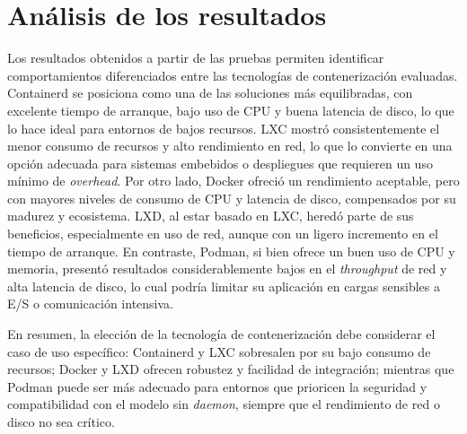 \section{Análisis de los resultados}
\noindent
Los resultados obtenidos a partir de las pruebas permiten identificar comportamientos diferenciados entre las tecnologías de contenerización evaluadas. Containerd se posiciona como una de las soluciones más equilibradas, con excelente tiempo de arranque, bajo uso de CPU y buena latencia de disco, lo que lo hace ideal para entornos de bajos recursos.
LXC mostró consistentemente el menor consumo de recursos y alto rendimiento en red, lo que lo convierte en una opción adecuada para sistemas embebidos o despliegues que requieren un uso mínimo de \textit{overhead}. 
Por otro lado, Docker ofreció un rendimiento aceptable, pero con mayores niveles de consumo de CPU y latencia de disco, compensados por su madurez y ecosistema. 
LXD, al estar basado en LXC, heredó parte de sus beneficios, especialmente en uso de red, aunque con un ligero incremento en el tiempo de arranque.
En contraste, Podman, si bien ofrece un buen uso de CPU y memoria, presentó resultados considerablemente bajos en el \textit{throughput} de red y alta latencia de disco, lo cual podría limitar su aplicación en cargas sensibles a E/S o comunicación intensiva.

\vspace{0.5em}

\noindent En resumen, la elección de la tecnología de contenerización debe considerar el caso de uso específico: Containerd y LXC sobresalen por su bajo consumo de recursos; Docker y LXD ofrecen robustez y facilidad de integración; mientras que Podman puede ser más adecuado para entornos que prioricen la seguridad y compatibilidad con el modelo sin \textit{daemon}, siempre que el rendimiento de red o disco no sea crítico.
